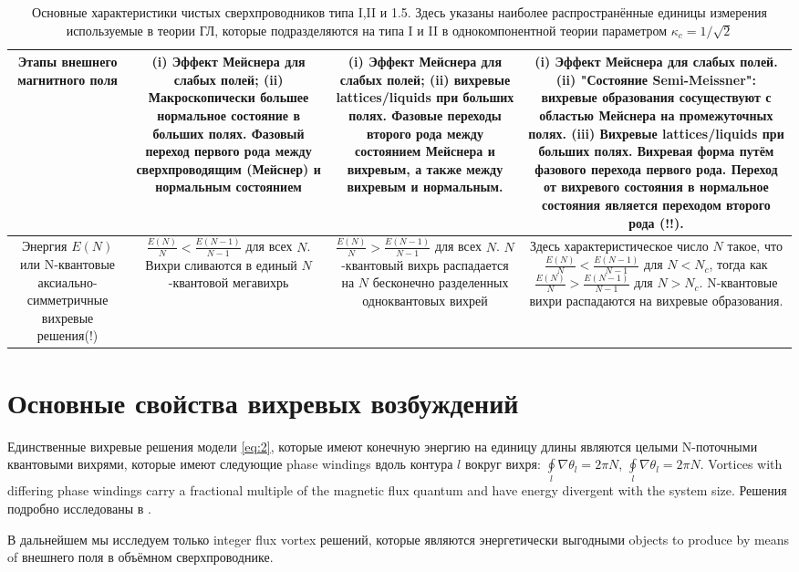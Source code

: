\begin{table}[ht]
\begin{tabular}{|C{.18}|C{.22}|C{.22}|C{.35}|}
        Этапы внешнего магнитного поля & (i) Эффект Мейснера для слабых полей; 
            (ii) Макроскопически большее нормальное состояние в больших полях. 
            Фазовый переход первого рода между сверхпроводящим (Мейснер) и 
            нормальным состоянием & (i) Эффект Мейснера для слабых полей; (ii) 
            вихревые lattices/liquids при больших полях. Фазовые переходы 
            второго рода между состоянием Мейснера и вихревым, а также 
            между вихревым и нормальным. & (i) Эффект Мейснера для слабых 
            полей. (ii) "Состояние Semi-Meissner": вихревые образования 
            сосуществуют с областью Мейснера на промежуточных полях. (iii) 
            Вихревые lattices/liquids при больших полях. Вихревая форма путём 
            фазового перехода первого рода. Переход от вихревого состояния в 
            нормальное состояния является переходом второго рода (!!).
        \\ \hline

        Энергия \( E(N) \) или N-квантовые аксиально-симметричные вихревые 
            решения(!) & \( \frac{E(N)}{N} < \frac{E(N-1)}{N-1} \) для всех 
            \( N \). Вихри сливаются в единый \( N \)-квантовой мегавихрь &
        \( \frac{E(N)}{N} > \frac{E(N-1)}{N-1} \) для всех \( N \). 
            \( N \)-квантовый вихрь распадается на \( N \) бесконечно 
            разделенных одноквантовых вихрей & Здесь характеристическое число 
            \( N \) такое, что \( \frac{E(N)}{N} < \frac{E(N-1)}{N-1} \) для 
            \( N < N_c \), тогда как 
            \( \frac{E(N)}{N} > \frac{E(N-1)}{N-1} \) для \( N > N_c \). 
            N-квантовые вихри распадаются на вихревые образования.
        \\ \hline

    \end{tabular}
    \caption{Основные характеристики чистых сверхпроводников типа I,II и 1.5. 
        Здесь указаны наиболее распространённые единицы измерения используемые 
        в теории ГЛ, которые подразделяются на типа I и II в 
        однокомпонентной теории параметром \( \kappa_c = 1/\sqrt{2} \)}
\end{table}

\section{Основные свойства вихревых возбуждений}
\label{sec:2-2}

Единственные вихревые решения модели \eqref{eq:2}, которые имеют конечную 
энергию на единицу длины являются целыми N-поточными квантовыми вихрями, 
которые имеют следующие phase windings вдоль контура \( l \) вокруг вихря: 
\( \oint\limits_l \nabla\theta_l = 2\pi N \), 
\( \oint\limits_l \nabla\theta_l = 2\pi N \). Vortices with differing phase 
windings carry a fractional multiple of the magnetic flux quantum and have 
energy divergent with the system size. Решения подробно исследованы в
\cite{bib:22}.

В дальнейшем мы исследуем только integer flux vortex решений, которые 
являются энергетически выгодными objects to produce by means of внешнего поля 
в объёмном сверхпроводнике.